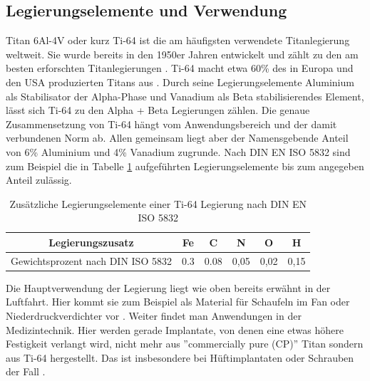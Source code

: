 \documentclass[a4paper, 11pt]{tubsreprt}
\begin{document}
\subsection{Legierungselemente und Verwendung}
Titan 6Al-4V oder kurz Ti-64 ist die am häufigsten verwendete Titanlegierung weltweit. Sie wurde bereits in den 1950er Jahren entwickelt und zählt zu den am besten erforschten Titanlegierungen \cite{Leyens2002}. Ti-64 macht etwa 60\% des in Europa und den USA produzierten Titans aus \cite{Sieniawski2013}. Durch seine Legierungselemente Aluminium als Stabilisator der Alpha-Phase und Vanadium als Beta stabilisierendes Element, lässt sich Ti-64 zu den Alpha + Beta Legierungen zählen. Die genaue Zusammensetzung von Ti-64 hängt vom Anwendungsbereich und der damit verbundenen Norm ab. Allen gemeinsam liegt aber der Namensgebende Anteil von 6\% Aluminium und 4\% Vanadium zugrunde. Nach DIN EN ISO 5832 sind zum Beispiel die in Tabelle \ref{Tabelle Norm Legierungselemente Ti64} aufgeführten Legierungselemente bis zum angegeben Anteil zulässig.

\begin{table}[t]
\begin{tabular}{c|c|c|c|c|c}
Legierungszusatz & Fe & C & N & O & H \\
\hline
Gewichtsprozent nach DIN ISO 5832 & 0.3 & 0.08 & 0,05 & 0,02 & 0,15 \\
\end{tabular}
\caption{Zusätzliche Legierungselemente einer Ti-64 Legierung nach DIN EN ISO 5832}
\label{Tabelle Norm Legierungselemente Ti64}
\end{table}

Die Hauptverwendung der Legierung liegt wie oben bereits erwähnt in der Luftfahrt. Hier kommt sie zum Beispiel als Material für Schaufeln im Fan oder Niederdruckverdichter vor \cite[vgl. S. 250ff.]{Luetjering2007}. Weiter findet man Anwendungen in der Medizintechnik. Hier werden gerade Implantate, von denen eine etwas höhere Festigkeit verlangt wird, nicht mehr aus ''commercially pure (CP)'' Titan sondern aus Ti-64 hergestellt. Das ist insbesondere bei Hüftimplantaten oder Schrauben der Fall \cite[S. 400 f.]{Luetjering2007}.
\end{document}
